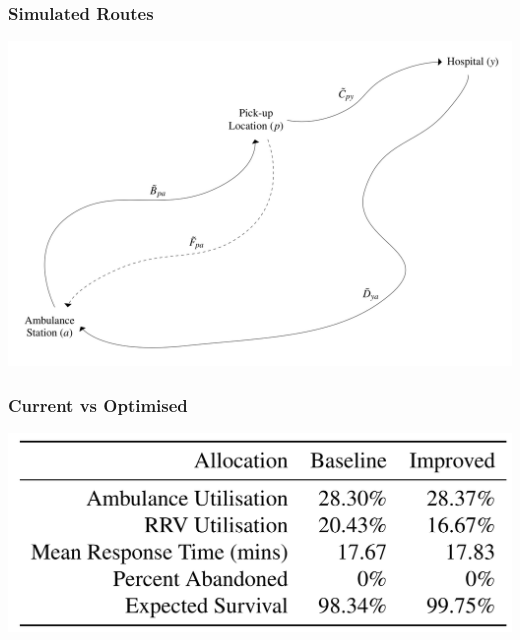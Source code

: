 \documentclass[xcolor={table}]{beamer}
\begin{document}
\begin{frame}
\frametitle{Simulated Routes}
\begin{center}
\includegraphics[width=\textwidth]{../images/ambulance_routes}
\end{center}
\end{frame}


\begin{frame}
\frametitle{Current vs Optimised}
\begin{center}
\includegraphics[width=\textwidth]{../images/compare_improved_allocation}
\end{center}
\end{frame}
\end{document}
